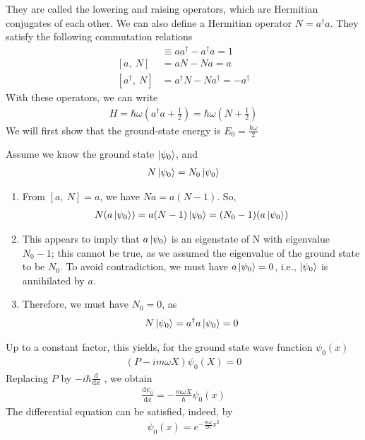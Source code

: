 They are called the lowering and raising operators, which are Hermitian conjugates of each other. We can also define a Hermitian operator $N = a^\dagger a$. They satisfy the following commutation relations
\begin{align*}
    [a,\ a^\dagger]&\equiv aa^\dagger-a^\dagger a=1 \\
    [a,\ N]&=  aN-Na=a\\
    [a^\dagger,\ N]&=a^\dagger N-Na^\dagger=-a^\dagger
\end{align*}
With these operators, we can write
\begin{align*}
    H=\hbar\omega\left( a^\dagger a+\frac{1}{2} \right)=\hbar\omega\left( N+\frac{1}{2} \right)
\end{align*}
We will first show that the ground-state energy is $E_0=\frac{\hbar\omega}{2}$

Assume we know the ground state $\ket{\psi_0}$, and
\begin{align*}
    N\ket{\psi_0}=N_0\ket{\psi_0}
\end{align*}
\begin{enumerate}
    \item From $[a,\ N] = a$, we have $Na = a(N - 1)$. So,
    \begin{align*}
        N(a\ket{\psi_0})=a(N-1)\ket{\psi_0}=(N_0-1)(a\ket{\psi_0})
    \end{align*}
    \item This appears to imply that $a\ket{\psi_0}$ is an eigenstate of N with eigenvalue $N_0 - 1$; this cannot be true, as we assumed the eigenvalue of the ground state to be $N_0$. To avoid contradiction, we must have $a\ket{\psi_0} = 0$, i.e., $\ket{\psi_0}$ is annihilated by $a$.
    \item Therefore, we must have $N_0=0$, as 
    \begin{align*}
        N\ket{\psi_0}=a^\dagger a\ket{\psi_0}=0
    \end{align*}
\end{enumerate}

Up to a constant factor, this yields, for the ground state wave function $\psi_0(x)$
\begin{align*}
    (P-im\omega X)\psi_0(X)=0
\end{align*}
Replacing $P$ by $-i\hbar\frac{\mathrm{d}}{\mathrm{d}x}$ , we obtain
\begin{align*}
    \frac{\mathrm{d}\psi_0}{\mathrm{d}x}=-\frac{m\omega X}{\hbar}\psi_0(x)
\end{align*}
The differential equation can be satisfied, indeed, by
\begin{align*}
    \psi_0(x)=e^{-\frac{m\omega}{2\hbar}x^2}
\end{align*}


